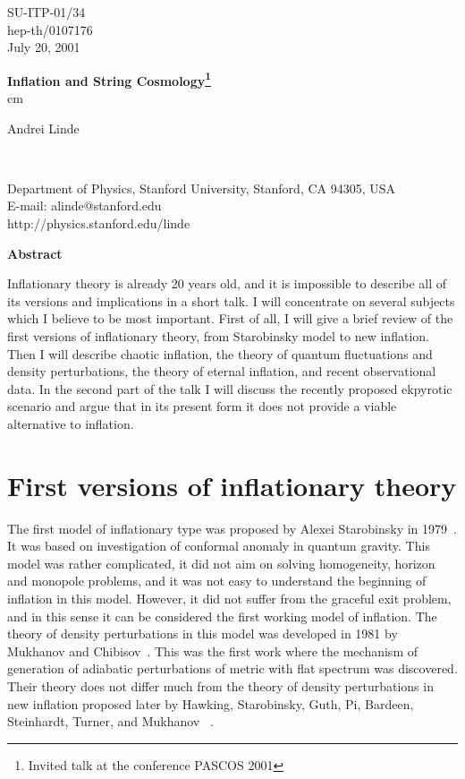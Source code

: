 \documentclass[a4paper,12pt]{article}
\begin{document}
\begin{titlepage}
\begin{flushright}
SU-ITP-01/34 \\ hep-th/0107176 \\ July 20, 2001
\end{flushright}
\vspace{.5cm}
\begin{center}
\baselineskip=16pt {\LARGE \bf Inflation and String Cosmology\footnote{Invited talk at the conference PASCOS 2001} }\\
 cm

{\large Andrei
Linde} \\
\vskip 0.3cm

\

{Department of Physics, Stanford University, Stanford, CA 94305, USA
\\E-mail: alinde@stanford.edu
\\http://physics.stanford.edu/linde}
\end{center}
\vskip 2cm
\begin{center}
{\bf Abstract}
\end{center}
{Inflationary theory is already 20 years old, and it is impossible to describe all of its  versions and implications in a short talk. I will concentrate on several subjects which I believe to be most important. First of all, I will give a brief review of the first versions of inflationary theory, from Starobinsky model to new inflation. Then I will describe chaotic inflation, the theory of quantum fluctuations and density perturbations, the theory of eternal inflation, and recent observational data. In the second part of the talk I will discuss the recently proposed ekpyrotic scenario and argue that in its present form it does not provide a viable alternative to inflation.
}
\end{titlepage}
\tableofcontents{}
 
\newpage

\section{First versions of  inflationary theory}




The first   model of inflationary type was proposed by Alexei Starobinsky
in 1979~\cite{Star}. It was based on investigation of conformal anomaly
in quantum gravity. This model was rather complicated, it did not aim on
solving homogeneity, horizon and monopole problems, and it was not easy
to understand the beginning of inflation in this model. However,  it did
not suffer from the graceful exit problem, and in this sense it can be
considered the first working model of inflation. The theory of density
perturbations in this model was developed in 1981 by Mukhanov and
Chibisov~\cite{Mukh}. This was the first work where the mechanism of generation of adiabatic perturbations of metric with flat spectrum was discovered. Their theory does not differ much from  the theory
of density perturbations  in new inflation proposed   later  by
Hawking, Starobinsky, Guth, Pi, Bardeen, Steinhardt,  Turner, and
Mukhanov ~\cite{Hawk,Mukh2}.
\end{document}
